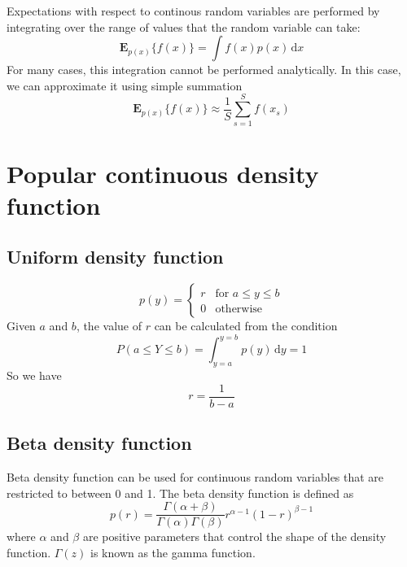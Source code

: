\documentclass[a4paper,11pt]{article} %
\begin{document}
Expectations with respect to continous random variables are performed by integrating
over the range of values that the random variable can take:
\begin{equation}
\mathbf{E}_{p(x)}\{f(x)\} = \int f(x) p(x)\,\mathrm{d}x
\end{equation}
For many cases, this integration cannot be performed analytically. In this case, we can
approximate it using simple summation
\begin{equation}
\mathbf{E}_{p(x)}\{f(x)\} \approx \frac{1}{S}\sum_{s=1}^{S} f(x_s)
\end{equation}


\section{Popular continuous density function}

\subsection{Uniform density function}
\begin{equation}
p(y) = \begin{cases}
r & \text{for } a \leq y \leq b \\
0 & \text{otherwise}
\end{cases}
\end{equation}
Given $a$ and $b$, the value of $r$ can be calculated from the condition
\begin{equation*}
P(a \leq Y \leq b) = \int_{y=a}^{y=b} p(y)\,\mathrm{d}y = 1
\end{equation*}
So we have
\begin{equation*}
r = \frac{1}{b - a}
\end{equation*}

\subsection{Beta density function}

Beta density function can be used for continuous random variables that are restricted to
between 0 and 1. The beta density function is defined as
\begin{equation}
p(r) = \frac{\Gamma(\alpha + \beta)}{\Gamma(\alpha)\Gamma(\beta)}
r^{\alpha-1} (1 - r)^{\beta - 1}
\end{equation}
where $\alpha$ and $\beta$ are positive parameters that control the shape of the density function.
$\Gamma(z)$ is known as the gamma function.
\end{document}
